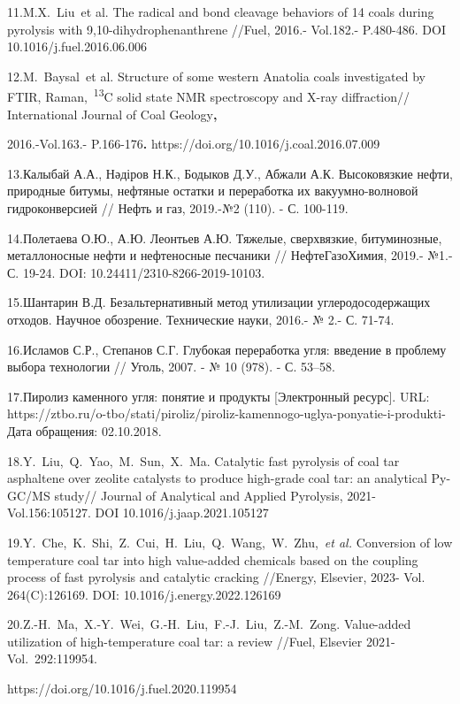 11.M.X.~Liu\emph{~}et al. The radical and bond cleavage behaviors of 14
coals during pyrolysis with 9,10-dihydrophenanthrene //Fuel, 2016.-
Vol.182.- P.480-486. DOI 10.1016/j.fuel.2016.06.006

12.M.~Baysal\emph{~}et al. Structure of some western Anatolia coals
investigated by FTIR, Raman,~\textsuperscript{13}C solid state NMR
spectroscopy and X-ray diffraction// International Journal of Coal
Geology\textbf{,}

2016.-Vol.163.- P.166-176\textbf{.}
https://doi.org/10.1016/j.coal.2016.07.009

13.Калыбай А.А., Нәдіров Н.К., Бодыков Д.У., Абжали А.К. Высоковязкие
нефти, природные битумы, нефтяные остатки и переработка их
вакуумно-волновой гидроконверсией // Нефть и газ, 2019.-№2 (110). - С.
100-119.

14.Полетаева О.Ю., А.Ю. Леонтьев А.Ю. Тяжелые, сверхвязкие,
битуминозные, металлоносные нефти и нефтеносные песчаники //
НефтеГазоХимия, 2019.- №1.- С. 19-24. DOI:
10.24411/2310-8266-2019-10103.

15.Шантарин В.Д. Безальтернативный метод утилизации углеродосодержащих
отходов. Научное обо­зрение. Технические науки, 2016.- № 2.- С. 71-74.

16.Исламов С.Р., Степанов С.Г. Глубокая переработка угля: введение в
проблему выбора технологии // Уголь, 2007. - № 10 (978). - С. 53--58.

17.Пиролиз каменного угля: понятие и продукты {[}Электронный ресурс{]}.
URL:
https://ztbo.ru/o-tbo/stati/piroliz/piroliz-kamennogo-uglya-ponyatie-i-produkti-Дата
обращения: 02.10.2018.

18.Y.~Liu,~Q.~Yao,~M.~Sun,~X.~Ma. Catalytic fast pyrolysis of coal tar
asphaltene over zeolite catalysts to produce high-grade coal tar: an
analytical Py-GC/MS study// Journal of Analytical and Applied Pyrolysis,
2021-Vol.156:105127. DOI 10.1016/j.jaap.2021.105127

19.Y.~Che,~K.~Shi,~Z.~Cui,~H.~Liu,~Q.~Wang,~W.~Zhu,~\emph{et al.}
Conversion of low temperature coal tar into high value-added chemicals
based on the coupling process of fast pyrolysis and catalytic cracking
//Energy, Elsevier, 2023- Vol. 264(C):126169. DOI:
10.1016/j.energy.2022.126169

20.Z.-H.~Ma,~X.-Y.~Wei,~G.-H.~Liu,~F.-J.~Liu,~Z.-M.~Zong. Value-added
utilization of high-temperature coal tar: a review //Fuel, Elsevier
2021- Vol.~292:119954.

https://doi.org/10.1016/j.fuel.2020.119954

